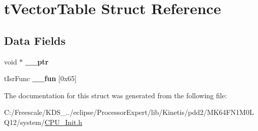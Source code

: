 \hypertarget{structt_vector_table}{}\section{t\+Vector\+Table Struct Reference}
\label{structt_vector_table}
\subsection*{Data Fields}
\begin{DoxyCompactItemize}
\item 
void $\ast$ {\bfseries \+\_\+\+\_\+ptr}\hypertarget{structt_vector_table_a324d365e9c8c6c033f4edbc906f94844}{}\label{structt_vector_table_a324d365e9c8c6c033f4edbc906f94844}

\item 
t\+Isr\+Func {\bfseries \+\_\+\+\_\+fun} \mbox{[}0x65\mbox{]}\hypertarget{structt_vector_table_ab3ae48880e150d73b1a58cb802a242c7}{}\label{structt_vector_table_ab3ae48880e150d73b1a58cb802a242c7}

\end{DoxyCompactItemize}


The documentation for this struct was generated from the following file\+:\begin{DoxyCompactItemize}
\item 
C\+:/\+Freescale/\+K\+D\+S\+\_../eclipse/\+Processor\+Expert/lib/\+Kinetis/pdd2/\+M\+K64\+F\+N1\+M0\+L\+Q12/system/\hyperlink{_c_p_u___init_8h}{C\+P\+U\+\_\+\+Init.\+h}\end{DoxyCompactItemize}
